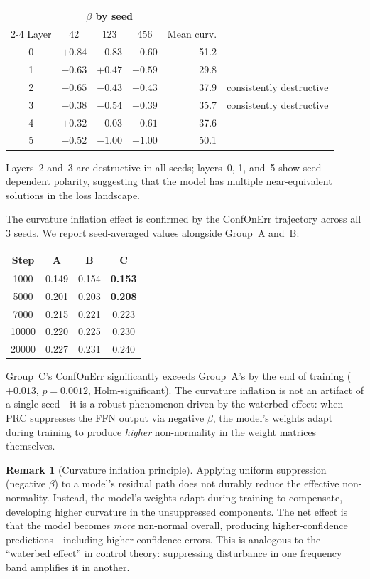 \documentclass[11pt,a4paper]{article}
\theoremstyle{definition}
\newtheorem{remark}[theorem]{Remark}
\begin{document}
\begin{center}
\begin{tabular}{ccccrl}
 & \multicolumn{3}{c}{$\beta$ by seed} & & \\
\cmidrule{2-4}
Layer & 42 & 123 & 456 & Mean curv. & \\
\midrule
0 & $+0.84$ & $-0.83$ & $+0.60$ & 51.2 &  \\
1 & $-0.63$ & $+0.47$ & $-0.59$ & 29.8 &  \\
2 & $-0.65$ & $-0.43$ & $-0.43$ & 37.9 & consistently destructive \\
3 & $-0.38$ & $-0.54$ & $-0.39$ & 35.7 & consistently destructive \\
4 & $+0.32$ & $-0.03$ & $-0.61$ & 37.6 &  \\
5 & $-0.52$ & $-1.00$ & $+1.00$ & 50.1 &  \\
\end{tabular}
\end{center}

Layers~2 and~3 are destructive in all seeds; layers~0, 1, and~5
show seed-dependent polarity, suggesting that the model has
multiple near-equivalent solutions in the loss landscape.

The curvature inflation effect is confirmed by the ConfOnErr
trajectory across all 3 seeds. We report seed-averaged values
alongside Group~A and~B:

\begin{center}
\begin{tabular}{cccc}
Step & A & B & C \\
\midrule
1000  & 0.149 & 0.154 & \textbf{0.153} \\
5000  & 0.201 & 0.203 & \textbf{0.208} \\
7000  & 0.215 & 0.221 & 0.223 \\
10000 & 0.220 & 0.225 & 0.230 \\
20000 & 0.227 & 0.231 & 0.240 \\
\end{tabular}
\end{center}

Group~C's ConfOnErr significantly exceeds Group~A's by the end of
training ($+0.013$, $p = 0.0012$, Holm-significant). The curvature
inflation is not an artifact of a single seed---it is a robust
phenomenon driven by the waterbed effect: when PRC suppresses the
FFN output via negative $\beta$, the model's weights adapt during
training to produce \emph{higher} non-normality in the weight
matrices themselves.

\begin{remark}[Curvature inflation principle]
\label{rem:curv-inflation}
Applying uniform suppression (negative $\beta$) to a model's
residual path does not durably reduce the effective non-normality.
Instead, the model's weights adapt during training to compensate,
developing higher curvature in the unsuppressed components. The
net effect is that the model becomes \emph{more} non-normal
overall, producing higher-confidence predictions---including
higher-confidence errors. This is analogous to the
``waterbed effect'' in control theory: suppressing disturbance
in one frequency band amplifies it in another.
\end{remark}
\end{document}
